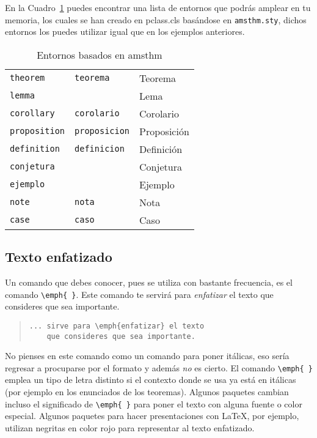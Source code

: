 En la Cuadro~\ref{amsthm} puedes encontrar una lista de entornos que podr\'as amplear en tu memoria, los cuales 
se han creado en pclass.cls bas\'andose en \texttt{amsthm.sty}, dichos entornos los puedes utilizar igual que en 
los ejemplos anteriores.

\begin{table}
	\hrulefill
	\begin{center}
		\begin{tabular}{ll@{\qquad}l}
\texttt{theorem}     		& \texttt{teorema}      	& Teorema               \\
\texttt{lemma}		   		&                       	& Lema									\\
\texttt{corollary	}	 		& \texttt{corolario}		 	& Corolario							\\
\texttt{proposition} 		& \texttt{proposicion}		& Proposici\'on         \\
\texttt{definition}		  & \texttt{definicion}			& Definici\'on					\\
\texttt{conjetura}			&                         & Conjetura							\\
\texttt{ejemplo}				&													& Ejemplo               \\
\texttt{note}						& \texttt{nota}						& Nota									\\
\texttt{case}						& \texttt{caso}						& Caso									\\
		\end{tabular}
	\end{center}
	\hrulefill
	\caption{Entornos basados en amsthm}
	\label{amsthm}
\end{table}


\subsection{Texto enfatizado}

Un comando que debes conocer, pues se utiliza con bastante frecuencia, es el comando \verb|\emph{ }|. 
Este comando te  servir\'a para \emph{enfatizar} el texto que consideres que sea importante.

\begin{quote}
\begin{verbatim}
... sirve para \emph{enfatizar} el texto 
	que consideres que sea importante.
\end{verbatim}
\end{quote}

No pienses en este comando como un comando para poner it\'alicas, eso ser\'ia regresar
a procuparse por el formato y adem\'as \emph{no} es cierto. El comando \verb|\emph{ }|
emplea un tipo de letra distinto si el contexto donde se usa ya est\'a en it\'alicas (por
ejemplo en los enunciados de los teoremas). Algunos paquetes cambian incluso el significado
de \verb|\emph{ }| para poner el texto con alguna fuente o color especial. Algunos
paquetes para hacer presentaciones con \LaTeX{}, por ejemplo, utilizan negritas en color
rojo para representar al texto enfatizado.

